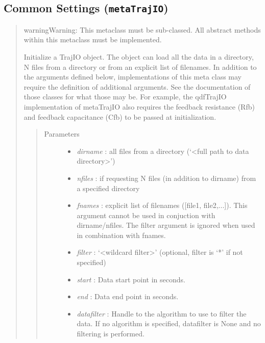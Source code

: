 \documentclass[letterpaper,10pt,english]{sphinxmanual}
\begin{document}
\subsection{Common Settings (\texttt{metaTrajIO})}
\label{doc/settingsFile:common-settings-metatrajio}\begin{quote}

\begin{notice}{warning}{Warning:}
This metaclass must be sub-classed. All abstract methods within this metaclass must be implemented.
\end{notice}

Initialize a TrajIO object. The object can load all the data in a directory,
N files from a directory or from an explicit list of filenames. In addition
to the arguments defined below, implementations of this meta class may require
the definition of additional arguments. See the documentation of those classes
for what those may be. For example, the qdfTrajIO implementation of metaTrajIO also requires
the feedback resistance (Rfb) and feedback capacitance (Cfb) to be passed at initialization.
\begin{quote}\begin{description}
\item[{Parameters}] \leavevmode\begin{itemize}
\item {} 
\emph{dirname} :           all files from a directory (`\textless{}full path to data directory\textgreater{}')

\item {} 
\emph{nfiles} :            if requesting N files (in addition to dirname) from a specified directory

\item {} 
\emph{fnames} :            explicit list of filenames ({[}file1, file2,...{]}). This argument cannot be used in conjuction with dirname/nfiles. The filter argument is ignored when used in combination with fnames.

\item {} 
\emph{filter} :            `\textless{}wildcard filter\textgreater{}' (optional, filter is `*' if not specified)

\item {} 
\emph{start} :             Data start point in seconds.

\item {} 
\emph{end} :                       Data end point in seconds.

\item {} 
\emph{datafilter} :        Handle to the algorithm to use to filter the data. If no algorithm is specified, datafilter     is None and no filtering is performed.


\end{itemize}
\end{description}
\end{quote}
\end{quote}
\end{document}
